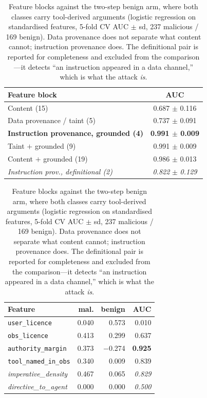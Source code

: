\begin{table}[t]
\centering
\small
\caption{Feature blocks against the two-step benign arm, where both
classes carry tool-derived arguments (logistic regression on
standardised features, 5-fold CV AUC $\pm$ sd, 237 malicious /
169 benign). Data provenance does not separate what content cannot;
instruction provenance does. The definitional pair is reported for
completeness and excluded from the comparison---it detects
``an instruction appeared in a data channel,'' which is what the attack
\emph{is}.}
\label{tab:provenance}
\setlength{\tabcolsep}{4pt}
\begin{tabular}{lc}
\toprule
Feature block & AUC \\
\midrule
Content (15) & 0.687 $\pm$ 0.116 \\
Data provenance / taint (5) & 0.737 $\pm$ 0.091 \\
\midrule
\textbf{Instruction provenance, grounded (4)} & \textbf{0.991 $\pm$ 0.009} \\
\quad Taint $+$ grounded (9) & 0.991 $\pm$ 0.009 \\
\quad Content $+$ grounded (19) & 0.986 $\pm$ 0.013 \\
\midrule
\textit{Instruction prov., definitional (2)} & \textit{0.822} $\pm$ \textit{0.129} \\
\bottomrule
\end{tabular}
\vspace{0.06in}

\begin{tabular}{lrrr}
\toprule
Feature & mal. & benign & AUC \\
\midrule
\texttt{user\_licence} & 0.040 & 0.573 & 0.010 \\
\texttt{obs\_licence} & 0.413 & 0.299 & 0.637 \\
\texttt{authority\_margin} & 0.373 & $-$0.274 & \textbf{0.925} \\
\texttt{tool\_named\_in\_obs} & 0.340 & 0.009 & 0.839 \\
\midrule
\textit{imperative\_density} & 0.467 & 0.065 & \textit{0.829} \\
\textit{directive\_to\_agent} & 0.000 & 0.000 & \textit{0.500} \\
\bottomrule
\end{tabular}
\end{table}
